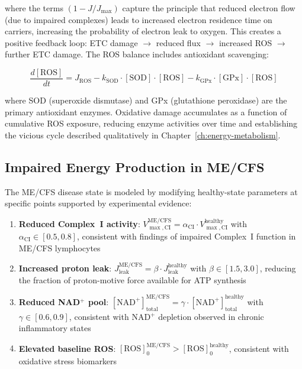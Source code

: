 where the terms $(1 - J/J_{\max})$ capture the principle that reduced electron flow (due to impaired complexes) leads to increased electron residence time on carriers, increasing the probability of electron leak to oxygen. This creates a positive feedback loop: ETC damage $\to$ reduced flux $\to$ increased ROS $\to$ further ETC damage. The ROS balance includes antioxidant scavenging:

\begin{equation}
\label{eq:ros-balance}
\frac{d[\text{ROS}]}{dt} = J_{\text{ROS}} - k_{\text{SOD}} \cdot [\text{SOD}] \cdot [\text{ROS}] - k_{\text{GPx}} \cdot [\text{GPx}] \cdot [\text{ROS}]
\end{equation}

where SOD (superoxide dismutase) and GPx (glutathione peroxidase) are the primary antioxidant enzymes. Oxidative damage accumulates as a function of cumulative ROS exposure, reducing enzyme activities over time and establishing the vicious cycle described qualitatively in Chapter~\ref{ch:energy-metabolism}.

\subsection{Impaired Energy Production in ME/CFS}
\label{sec:impaired-energy}

The ME/CFS disease state is modeled by modifying healthy-state parameters at specific points supported by experimental evidence:

\begin{enumerate}
    \item \textbf{Reduced Complex~I activity}: $V_{\max,\text{CI}}^{\text{ME/CFS}} = \alpha_{\text{CI}} \cdot V_{\max,\text{CI}}^{\text{healthy}}$ with $\alpha_{\text{CI}} \in [0.5, 0.8]$, consistent with findings of impaired Complex~I function in ME/CFS lymphocytes~\cite{Tomas2017}
    \item \textbf{Increased proton leak}: $J_{\text{leak}}^{\text{ME/CFS}} = \beta \cdot J_{\text{leak}}^{\text{healthy}}$ with $\beta \in [1.5, 3.0]$, reducing the fraction of proton-motive force available for ATP synthesis
    \item \textbf{Reduced NAD$^+$ pool}: $[\text{NAD}^+]_{\text{total}}^{\text{ME/CFS}} = \gamma \cdot [\text{NAD}^+]_{\text{total}}^{\text{healthy}}$ with $\gamma \in [0.6, 0.9]$, consistent with NAD$^+$ depletion observed in chronic inflammatory states~\cite{syed2025nad_therapy}
    \item \textbf{Elevated baseline ROS}: $[\text{ROS}]_0^{\text{ME/CFS}} > [\text{ROS}]_0^{\text{healthy}}$, consistent with oxidative stress biomarkers
\end{enumerate}

